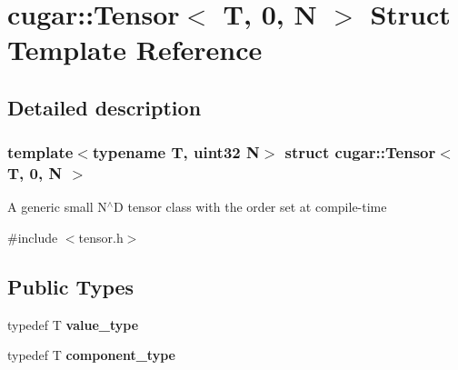 \hypertarget{structcugar_1_1_tensor_3_01_t_00_010_00_01_n_01_4}{}\section{cugar\+:\+:Tensor$<$ T, 0, N $>$ Struct Template Reference}
\label{structcugar_1_1_tensor_3_01_t_00_010_00_01_n_01_4}


\subsection{Detailed description}
\subsubsection*{template$<$typename T, uint32 N$>$\newline
struct cugar\+::\+Tensor$<$ T, 0, N $>$}

A generic small N$^\wedge$D tensor class with the order set at compile-\/time 

{\ttfamily \#include $<$tensor.\+h$>$}

\subsection*{Public Types}
\begin{DoxyCompactItemize}
\item 
\mbox{\label{structcugar_1_1_tensor_3_01_t_00_010_00_01_n_01_4_a45bc2ce6b6215e5989389ab976eb5b94}} 
typedef T {\bfseries value\+\_\+type}
\item 
\mbox{\label{structcugar_1_1_tensor_3_01_t_00_010_00_01_n_01_4_a58b0b5c8c3ff92af9a588eee564d6350}} 
typedef T {\bfseries component\+\_\+type}
\end{DoxyCompactItemize}
